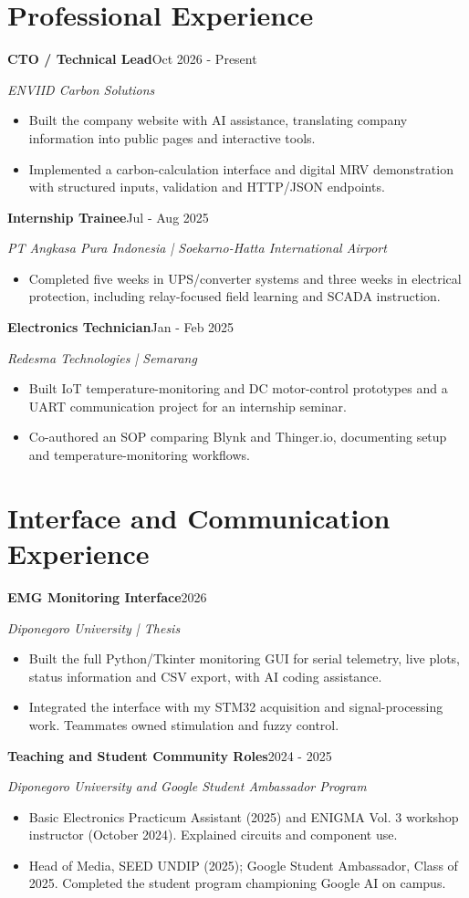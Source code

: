 \documentclass[11pt,a4paper]{article}
\newcommand{\entry}[3]{\Needspace{4\baselineskip}\textbf{#1}\hfill #2\par\textit{#3}\par}
\begin{document}
\section{Professional Experience}
\entry{CTO / Technical Lead}{Oct 2026 - Present}{ENVIID Carbon Solutions}
\begin{itemize}
\item Built the company website with AI assistance, translating company information into public pages and interactive tools.
\item Implemented a carbon-calculation interface and digital MRV demonstration with structured inputs, validation and HTTP/JSON endpoints.
\end{itemize}
\entry{Internship Trainee}{Jul - Aug 2025}{PT Angkasa Pura Indonesia | Soekarno-Hatta International Airport}
\begin{itemize}
\item Completed five weeks in UPS/converter systems and three weeks in electrical protection, including relay-focused field learning and SCADA instruction.
\end{itemize}
\entry{Electronics Technician}{Jan - Feb 2025}{Redesma Technologies | Semarang}
\begin{itemize}
\item Built IoT temperature-monitoring and DC motor-control prototypes and a UART communication project for an internship seminar.
\item Co-authored an SOP comparing Blynk and Thinger.io, documenting setup and temperature-monitoring workflows.
\end{itemize}
\section{Interface and Communication Experience}
\entry{EMG Monitoring Interface}{2026}{Diponegoro University | Thesis}
\begin{itemize}
\item Built the full Python/Tkinter monitoring GUI for serial telemetry, live plots, status information and CSV export, with AI coding assistance.
\item Integrated the interface with my STM32 acquisition and signal-processing work. Teammates owned stimulation and fuzzy control.
\end{itemize}
\entry{Teaching and Student Community Roles}{2024 - 2025}{Diponegoro University and Google Student Ambassador Program}
\begin{itemize}
\item Basic Electronics Practicum Assistant (2025) and ENIGMA Vol. 3 workshop instructor (October 2024). Explained circuits and component use.
\item Head of Media, SEED UNDIP (2025); Google Student Ambassador, Class of 2025. Completed the student program championing Google AI on campus.
\end{itemize}
\end{document}
